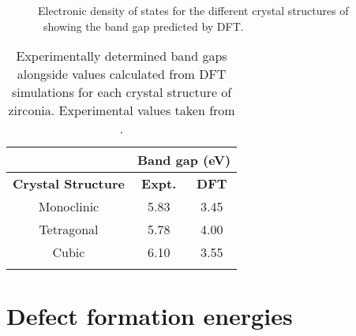 \begin{figure}
\begin{center}
		\caption{Electronic density of states for the different crystal structures of \zirconia\ showing the band gap predicted by DFT.}
		\label{figure:densityofstates}
	\end{center}
\end{figure}

\begin{table}[ht] %
\onehalfspacing
\centering
\caption[Experimentally determined band gaps alongside values calculated from DFT simulations for each crystal structure of zirconia.]{Experimentally determined band gaps alongside values calculated from DFT simulations for each crystal structure of zirconia. Experimental values taken from \cite{French1994}.}
\begin{tabular}{ccc}
{\bf }                                       & \multicolumn{2}{c}{{\bf Band gap (eV)}}      \\ \hline
\multicolumn{1}{c}{{\bf Crystal Structure}} & \multicolumn{1}{c}{{\bf Expt.}} & {\bf DFT} \\ \hline
\multicolumn{1}{c}{Monoclinic}              & \multicolumn{1}{c}{5.83}        & 3.45      \\
\multicolumn{1}{c}{Tetragonal}              & \multicolumn{1}{c}{5.78}        & 4.00      \\
\multicolumn{1}{c}{Cubic}                   & \multicolumn{1}{c}{6.10}         &   3.55 \\ \hline
\label{table:bandgap}
\end{tabular}
\end{table}

\section{Defect formation energies}

